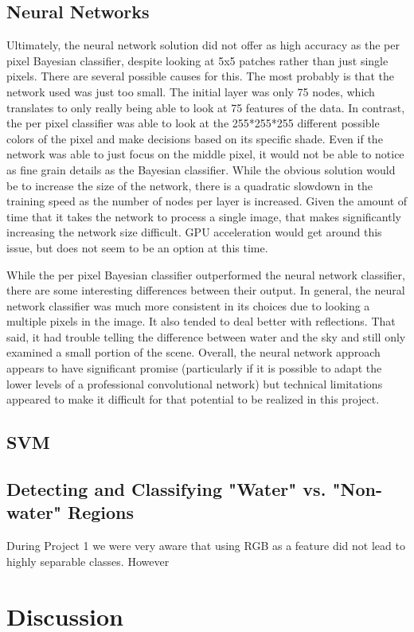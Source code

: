 \documentclass[12pt]{article}
\begin{document}
	\subsection{Neural Networks}
	Ultimately, the neural network solution did not offer as high accuracy as the per pixel Bayesian classifier, despite looking at 5x5 patches rather than just single pixels.  There are several possible causes for this.  The most probably is that the network used was just too small.  The initial layer was only 75 nodes, which translates to only really being able to look at 75 features of the data.  In contrast, the per pixel classifier was able to look at the 255*255*255 different possible colors of the pixel and make decisions based on its specific shade.  Even if the network was able to just focus on the middle pixel, it would not be able to notice as fine grain details as the Bayesian classifier.  While the obvious solution would be to increase the size of the network, there is a quadratic slowdown in the training speed as the number of nodes per layer is increased.  Given the amount of time that it takes the network to process a single image, that makes significantly increasing the network size difficult.  GPU acceleration would get around this issue, but does not seem to be an option at this time.

	While the per pixel Bayesian classifier outperformed the neural network classifier, there are some interesting differences between their output.  In general, the neural network classifier was much more consistent in its choices due to looking a multiple pixels in the image.  It also tended to deal better with reflections.  That said, it had trouble telling the difference between water and the sky and still only examined a small portion of the scene.  Overall, the neural network approach appears to have significant promise (particularly if it is possible to adapt the lower levels of a professional convolutional network) but technical limitations appeared to make it difficult for that potential to be realized in this project.

	\subsection{SVM}
	\subsection{Detecting and Classifying "Water" vs. "Non-water" Regions}
	During Project 1 we were very aware that using RGB as a feature did not lead to highly separable classes. However


\section{Discussion}


   
\end{document}
